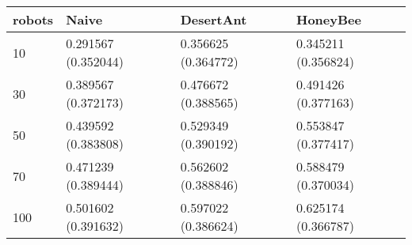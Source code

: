 \begin{tabular} {|l|l|l|l|}
\hline
robots & Naive & DesertAnt & HoneyBee \\
\hline
10 & 0.291567 (0.352044)  & 0.356625 (0.364772)  & 0.345211 (0.356824)  \\
30 & 0.389567 (0.372173)  & 0.476672 (0.388565)  & 0.491426 (0.377163)  \\
50 & 0.439592 (0.383808)  & 0.529349 (0.390192)  & 0.553847 (0.377417)  \\
70 & 0.471239 (0.389444)  & 0.562602 (0.388846)  & 0.588479 (0.370034)  \\
100 & 0.501602 (0.391632)  & 0.597022 (0.386624)  & 0.625174 (0.366787)  \\
\hline
\end{tabular}
